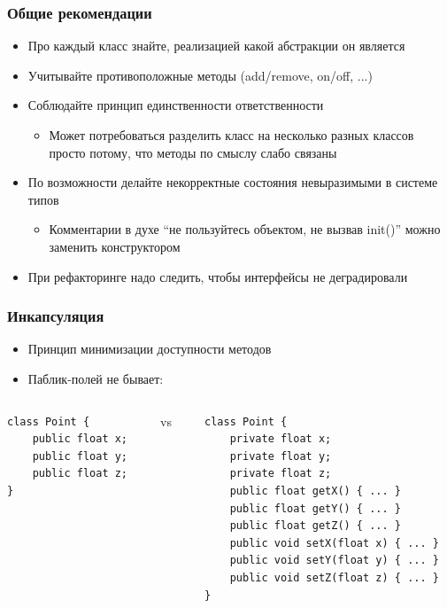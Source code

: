 \documentclass[xetex,mathserif,serif]{beamer}
\begin{document}
    \begin{frame}
        \frametitle{Общие рекомендации}
        \begin{itemize}
            \item Про каждый класс знайте, реализацией какой абстракции он является
            \item Учитывайте противоположные методы (add/remove, on/off, ...)
            \item Соблюдайте принцип единственности ответственности
            \begin{itemize}
                \item Может потребоваться разделить класс на несколько разных классов просто потому, что методы по смыслу слабо связаны
            \end{itemize}
            \item По возможности делайте некорректные состояния невыразимыми в системе типов
            \begin{itemize}
                \item Комментарии в духе ``не пользуйтесь объектом, не вызвав  init()'' можно заменить конструктором
            \end{itemize}
            \item При рефакторинге надо следить, чтобы интерфейсы не деградировали
        \end{itemize}
    \end{frame}

    \begin{frame}[fragile]
        \frametitle{Инкапсуляция}
        \begin{itemize}
            \item Принцип минимизации доступности методов
            \item Паблик-полей не бывает:
        \end{itemize}
        \begin{columns}
            \begin{column}{0.25\textwidth}
                \begin{verbatim}
class Point {
    public float x;
    public float y;
    public float z;
}
                \end{verbatim}
            \end{column}
            \begin{column}{0.1\textwidth}
                vs
            \end{column}
            \begin{column}{0.5\textwidth}
                \begin{verbatim}
class Point {
    private float x;
    private float y;
    private float z;
    public float getX() { ... }
    public float getY() { ... }
    public float getZ() { ... }
    public void setX(float x) { ... }
    public void setY(float y) { ... }
    public void setZ(float z) { ... }
}
                \end{verbatim}
            \end{column}
        \end{columns}
    \end{frame}
\end{document}
